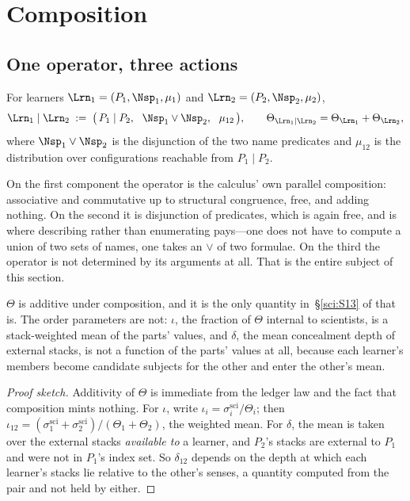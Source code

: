 \section{Composition}\label{com:sec:comp}\label{com:S4}

\subsection{One operator, three actions}\label{com:S4.1}

\begin{definition}[Composition]\label{com:def:comp}
For learners $\Lrn_1 = (P_1,\Nsp_1,\mu_1)$ and $\Lrn_2 = (P_2,\Nsp_2,\mu_2)$,
\[
  \Lrn_1 \mid \Lrn_2 \;:=\; \bigl(\,P_1 \mid P_2,\ \ \Nsp_1 \vee \Nsp_2,\ \ \mu_{12}\,\bigr),
  \qquad \Theta_{\Lrn_1 \mid \Lrn_2} = \Theta_{\Lrn_1} + \Theta_{\Lrn_2},
\]
where $\Nsp_1 \vee \Nsp_2$ is the disjunction of the two name predicates and $\mu_{12}$ is the
distribution over configurations reachable from $P_1 \mid P_2$.
\end{definition}

On the first component the operator is the calculus' own parallel composition: associative and
commutative up to structural congruence, free, and adding nothing. On the second it is
disjunction of predicates, which is again free, and is where describing rather than enumerating
pays---one does not have to compute a union of two sets of names, one takes an $\vee$ of two
formulae. On the third the operator is not determined by its arguments at all. That is the
entire subject of this section.

\begin{proposition}\label{com:conservation-composes-only-conservation}
$\Theta$ is additive under composition, and it is the only quantity in~\S\ref{sci:S13} of \chSci
that is. The order parameters are not: $\iota$, the fraction of $\Theta$ internal to scientists,
is a stack-weighted mean of the parts' values, and $\delta$, the mean concealment depth of
external stacks, is not a function of the parts' values at all, because each learner's members
become candidate subjects for the other and enter the other's mean.
\end{proposition}

\begin{proof}[Proof sketch]
Additivity of $\Theta$ is immediate from the ledger law and the fact that composition mints
nothing. For $\iota$, write $\iota_i = \sigma^{\mathrm{sci}}_i / \Theta_i$; then
$\iota_{12} = (\sigma^{\mathrm{sci}}_1 + \sigma^{\mathrm{sci}}_2)/(\Theta_1+\Theta_2)$, the
weighted mean. For $\delta$, the mean is taken over the external stacks \emph{available to} a
learner, and $P_2$'s stacks are external to $P_1$ and were not in $P_1$'s index set. So
$\delta_{12}$ depends on the depth at which each learner's stacks lie relative to the other's
senses, a quantity computed from the pair and not held by either.
\end{proof}

